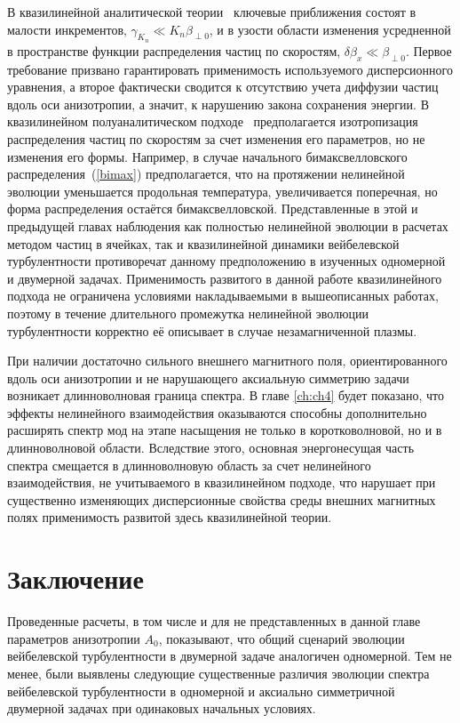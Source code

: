В квазилинейной аналитической теории~\cite{Pokhotelov2011,GaleevSagdeev1969} ключевые приближения состоят в малости инкрементов, $\gamma_{K_n}\ll K_n\beta_{\perp0}$, и в узости области изменения усредненной в пространстве функции распределения частиц по скоростям, $\delta \beta_x\ll \beta_{\perp0}$.
Первое требование призвано гарантировать применимость используемого дисперсионного уравнения, а второе фактически сводится к отсутствию учета диффузии частиц вдоль оси анизотропии, а значит, к нарушению закона сохранения энергии.
В квазилинейном полуаналитическом подходе~\cite{Seough2015b,Seough2015a,Ruyer2015} предполагается изотропизация распределения частиц по скоростям за счет изменения его параметров, но не изменения его формы.
Например, в случае начального бимаксвелловского распределения~(\ref{bimax}) предполагается, что на протяжении нелинейной эволюции уменьшается продольная температура, увеличивается поперечная, но форма распределения остаётся бимаксвелловской. 
Представленные в этой и предыдущей главах наблюдения как полностью нелинейной эволюции в расчетах методом частиц в ячейках, так и квазилинейной динамики вейбелевской турбулентности противоречат данному предположению в изученных одномерной и двумерной задачах.  
Применимость развитого в данной работе квазилинейного подхода не ограничена условиями накладываемыми в вышеописанных работах, поэтому в течение длительного промежутка нелинейной эволюции турбулентности корректно её описывает в случае незамагниченной плазмы.  

При наличии достаточно сильного внешнего магнитного поля, ориентированного вдоль оси анизотропии и не нарушающего аксиальную симметрию задачи возникает длинноволновая граница спектра.
В главе \ref{ch:ch4} будет показано, что эффекты нелинейного взаимодействия оказываются способны дополнительно расширять спектр мод на этапе насыщения не только в коротковолновой, но и в длинноволновой области.  
Вследствие этого, основная энергонесущая часть спектра смещается в длинноволновую область за счет нелинейного взаимодействия, не учитываемого в квазилинейном подходе, что нарушает при существенно изменяющих дисперсионные свойства среды внешних магнитных полях применимость развитой здесь квазилинейной теории.

\section{Заключение} 

Проведенные расчеты, в том числе и для не представленных в данной главе параметров анизотропии $A_0$, показывают, что общий сценарий эволюции вейбелевской турбулентности в двумерной задаче аналогичен одномерной. 
Тем не менее, были выявлены следующие существенные различия эволюции спектра вейбелевской турбулентности в одномерной и аксиально симметричной двумерной задачах при одинаковых начальных условиях. 


